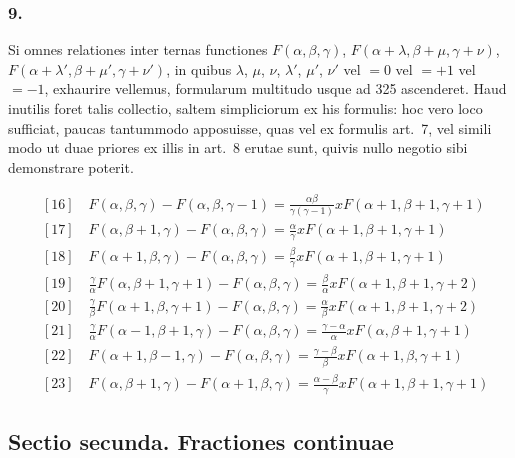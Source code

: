 \documentclass[12pt,a4paper]{article}
\newcommand{\1}{\ensuremath{\mathrlap{\,|\,}}} %
\begin{document}
\subsubsection*{9.}

Si omnes relationes inter ternas functiones $F(\alpha, \beta, \gamma)$, $F(\alpha+\lambda, \beta+\mu, \gamma+\nu)$, $F(\alpha+\lambda', \beta+\mu', \gamma+\nu')$, in quibus $\lambda$, $\mu$, $\nu$, $\lambda'$, $\mu'$, $\nu'$ vel $=0$ vel $=+1$ vel $=-1$, exhaurire vellemus, formularum multitudo usque ad 325 ascenderet. Haud inutilis foret talis collectio, saltem simpliciorum ex his formulis: hoc vero loco sufficiat, paucas tantummodo apposuisse, quas vel ex formulis art.~7, vel simili modo ut duae priores ex illis in art.~8 erutae sunt, quivis nullo negotio sibi demonstrare poterit.

\begin{align*}
&[16]\quad F(\alpha, \beta, \gamma) - F(\alpha, \beta, \gamma-1) = \frac{\alpha\beta}{\gamma(\gamma-1)}xF(\alpha+1, \beta+1, \gamma+1)\\
&[17]\quad F(\alpha, \beta+1, \gamma) - F(\alpha, \beta, \gamma) = \frac{\alpha}{\gamma}xF(\alpha+1, \beta+1, \gamma+1)\\
&[18]\quad F(\alpha+1, \beta, \gamma) - F(\alpha, \beta, \gamma) = \frac{\beta}{\gamma}xF(\alpha+1, \beta+1, \gamma+1)\\
&[19]\quad \frac{\gamma}{\alpha}F(\alpha, \beta+1, \gamma+1) - F(\alpha, \beta, \gamma) = \frac{\beta}{\alpha}xF(\alpha+1, \beta+1, \gamma+2)\\
&[20]\quad \frac{\gamma}{\beta}F(\alpha+1, \beta, \gamma+1) - F(\alpha, \beta, \gamma) = \frac{\alpha}{\beta}xF(\alpha+1, \beta+1, \gamma+2)\\
&[21]\quad \frac{\gamma}{\alpha}F(\alpha-1, \beta+1, \gamma) - F(\alpha, \beta, \gamma) = \frac{\gamma-\alpha}{\alpha}xF(\alpha, \beta+1, \gamma+1)\\
&[22]\quad F(\alpha+1, \beta-1, \gamma) - F(\alpha, \beta, \gamma) = \frac{\gamma-\beta}{\beta}xF(\alpha+1, \beta, \gamma+1)\\
&[23]\quad F(\alpha, \beta+1, \gamma) - F(\alpha+1, \beta, \gamma) = \frac{\alpha-\beta}{\gamma}xF(\alpha+1, \beta+1, \gamma+1)
\end{align*}

\newpage
\subsection*{Sectio secunda. Fractiones continuae}
\end{document}
